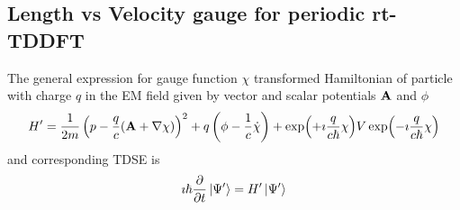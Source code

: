\documentclass[11pt]{article}
\begin{document}
\subsection{ Length vs Velocity gauge for periodic rt-TDDFT }

The general expression for gauge function $\chi$ transformed Hamiltonian of particle with charge $q$ in  the EM field given by vector and scalar potentials  $\vb A$ and $\phi$
\begin{equation}
    H'=  \frac{1}{2m} \left(p-\frac{q}{c}(\vb A +\nabla \chi) \right)^2  + q\left( \phi  - \frac{1}{c} \dot \chi \right)   +  \exp(+\imath \frac{q}{c\hbar}\chi)  V \exp(-\imath \frac{q}{c\hbar}\chi)    
    \label{eq:hamiltonian_general_gauge}
\end{equation}
and corresponding  TDSE is
\begin{equation}
\imath \hbar \pdv{}{t} \ket{\Psi'} = H'  \ket{\Psi'} 
\end{equation}
\end{document}
